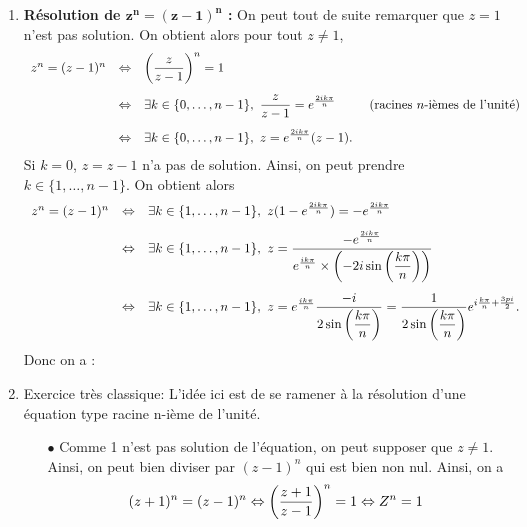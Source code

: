 \documentclass[a4paper, 11pt]{article}
\begin{document}

\begin{correction}   \;
\begin{enumerate}
\item  \textbf{R\'esolution de $\mathbf{z^n=(z-1)^n}$ :}
On peut tout de suite remarquer que $z=1$ n'est pas solution. On obtient alors pour tout $z\not= 1$,
$$\begin{array}{llll}
z^n=(z-1)^n&\Leftrightarrow & \left( \ddp\frac{z}{z-1} \right)^n=1\vsec\\
& \Leftrightarrow & \exists k\in\lbrace 0,\dots, n-1\rbrace,\ \ddp\frac{z}{z-1}=e^{\frac{2ik\pi}{n}}& \textmd{ (racines $n$-i\`emes de l'unit\'e)}\vsec\\
& \Leftrightarrow & \exists k\in\lbrace 0,\dots, n-1\rbrace,\ z=e^{\frac{2ik\pi}{n}}(z-1).
\end{array}$$
Si $k=0$, $z=z-1$ n'a pas de solution. Ainsi, on peut prendre $k\in\lbrace 1,\dots,n-1\rbrace$. On obtient alors
$$\begin{array}{lll}
z^n=(z-1)^n&\Leftrightarrow & \exists k\in\lbrace 1,\dots, n-1\rbrace,\ z(1-e^{\frac{2ik\pi}{n}})=-e^{\frac{2ik\pi}{n}}\vsec\\
&\Leftrightarrow & \exists k\in\lbrace 1,\dots, n-1\rbrace,\ z=\ddp\frac{-e^{\frac{2ik\pi}{n}}}{e^{\frac{ik\pi}{n}}\times \left(-2i\sin{\left( \ddp\frac{k\pi}{n}\right)}\right)   }\vsec\\
&\Leftrightarrow & \exists k\in\lbrace 1,\dots, n-1\rbrace,\ z=e^{\frac{ik\pi}{n}}\ddp\frac{-i}{2\sin{\left( \ddp\frac{k\pi}{n}\right)}} = \frac{1}{2\sin{\left( \ddp\frac{k\pi}{n}\right)}} e^{i\frac{k\pi}{n}+ \frac{3pi}{2}}.
\end{array}$$
Donc on a : 
\item Exercice tr\`{e}s classique: L'id\'ee ici est de se ramener \`{a} la r\'esolution d'une \'equation type racine n-i\`{e}me de l'unit\'e.
\begin{itemize}
\item[$\bullet$] Comme 1 n'est pas solution de l'\'equation, on peut supposer que $z\not= 1$. Ainsi, on peut bien diviser par $(z-1)^n$ qui est bien non nul. Ainsi, on a
$$(z+1)^n=(z-1)^n\Leftrightarrow \left( \displaystyle\frac{z+1}{z-1}\right)^n=1\Leftrightarrow Z^n=1$$

\end{itemize}
\end{enumerate}
\end{correction}
\end{document}
